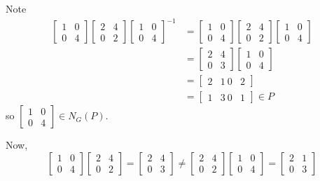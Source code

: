 \documentclass[12pt]{Qual}
\begin{document}
\begin{solution}
\begin{enumerate}[label=(\alph*)]
    Note \begin{align*}
        \begin{bmatrix}
    1 & 0\\
    0 & 4
    \end{bmatrix}\begin{bmatrix}
    2 & 4\\
    0 & 2
    \end{bmatrix}\begin{bmatrix}
    1 & 0\\
    0 & 4
    \end{bmatrix}^{-1}&=\begin{bmatrix}
    1 & 0\\
    0 & 4
    \end{bmatrix}\begin{bmatrix}
    2 & 4\\
    0 & 2
    \end{bmatrix}\begin{bmatrix}
    1 & 0\\
    0 & 4
    \end{bmatrix}\\
    &=\begin{bmatrix}
    2 & 4\\
    0 & 3
    \end{bmatrix}\begin{bmatrix}
    1 & 0\\
    0 & 4
    \end{bmatrix}\\
    &=\begin{bmatrix}
    2 & 1\
    0 & 2
    \end{bmatrix}\\
    &=\begin{bmatrix}
    1 & 3\
    0 & 1
    \end{bmatrix}\in P
    \end{align*} so $\begin{bmatrix}
    1 & 0\\
    0 & 4
    \end{bmatrix}\in N_G(P).$

    Now, $$\begin{bmatrix}
    1 & 0\\
    0 & 4
    \end{bmatrix}\begin{bmatrix}
    2 & 4\\
    0 & 2
    \end{bmatrix}=\begin{bmatrix}
    2 & 4\\
    0 & 3
    \end{bmatrix}\not=\begin{bmatrix}
    2 & 4\\
    0 & 2
    \end{bmatrix}\begin{bmatrix}
    1 & 0\\
    0 & 4
    \end{bmatrix}=\begin{bmatrix}
    2 & 1\\
    0 & 3
    \end{bmatrix}$$


\end{enumerate}
\end{solution}
\end{document}
